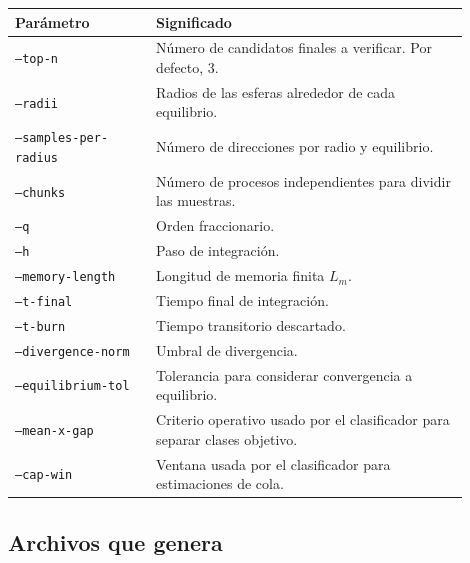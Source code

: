 \documentclass[11pt,letterpaper]{article}
\begin{document}
\begin{center}
\begin{tabular}{L{0.28\linewidth}L{0.62\linewidth}}
\toprule
Parámetro & Significado \\
\midrule
\texttt{--top-n} & Número de candidatos finales a verificar. Por defecto, 3. \\
\texttt{--radii} & Radios de las esferas alrededor de cada equilibrio. \\
\texttt{--samples-per-radius} & Número de direcciones por radio y equilibrio. \\
\texttt{--chunks} & Número de procesos independientes para dividir las muestras. \\
\texttt{--q} & Orden fraccionario. \\
\texttt{--h} & Paso de integración. \\
\texttt{--memory-length} & Longitud de memoria finita $L_m$. \\
\texttt{--t-final} & Tiempo final de integración. \\
\texttt{--t-burn} & Tiempo transitorio descartado. \\
\texttt{--divergence-norm} & Umbral de divergencia. \\
\texttt{--equilibrium-tol} & Tolerancia para considerar convergencia a equilibrio. \\
\texttt{--mean-x-gap} & Criterio operativo usado por el clasificador para separar clases objetivo. \\
\texttt{--cap-win} & Ventana usada por el clasificador para estimaciones de cola. \\
\bottomrule
\end{tabular}
\end{center}

\subsection{Archivos que genera}
\end{document}
